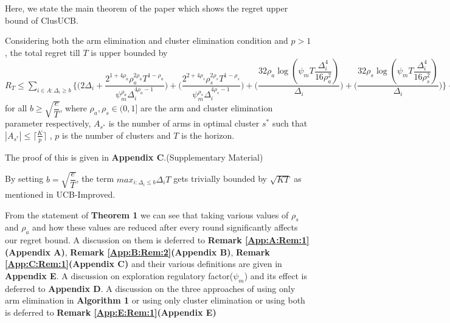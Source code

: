 	
	Here, we state the main theorem of the paper which shows the regret upper bound of ClusUCB.
	
\begin{theorem}
\label{Result:Theorem:1}
Considering both the arm elimination and cluster elimination condition and $p>1$, the total regret till $T$ is upper bounded by $R_{T}\leq \sum\limits_{i\in A:\Delta_{i}\geq b} \bigg\lbrace \bigg(2\Delta_{i}+\dfrac{2^{1+4\rho_{a}}\rho_{a}^{2\rho_{a}}T^{1-\rho_{a}}}{\psi_{m}^{\rho_{a}}\Delta_{i}^{4\rho_{a}-1}}\bigg) + \bigg(\dfrac{2^{2+4\rho_{s}}\rho_{s}^{2\rho_{s}}T^{1-\rho_{s}}}{\psi_{m}^{\rho_{s}}\Delta_{i}^{4\rho_{s}-1}}\bigg) + \bigg(\dfrac{32\rho_{a}\log{(\psi_{m}T\dfrac{\Delta_{i}^{4}}{16\rho_{a}^{2}})}}{\Delta_{i}}\bigg) + \bigg(\dfrac{32\rho_{s}\log{(\psi_{m}T\dfrac{\Delta_{i}^{4}}{16\rho_{s}^{2}})}}{\Delta_{i}}\bigg)\bigg\rbrace + \sum\limits_{i\in A_{s^{*}}:0\leq\Delta_{i}\leq b}\bigg\lbrace \bigg(\dfrac{T^{1-\rho_{a}}\rho_{a}^{2\rho_{a}}2^{2\rho_{a}+\frac{3}{2}}}{\psi_{m}^{\rho_{a}}\Delta_{i}^{4\rho_{a}-1}} \bigg)+\bigg(\dfrac{T^{1-\rho_{a}}\rho_{a}^{2\rho_{a}}2^{2\rho_{a}+\frac{3}{2}}}{\psi_{m}^{\rho_{a}}b^{4\rho_{a} -1}} \bigg)\bigg\rbrace + \sum\limits_{i\in A:0\leq\Delta_{i}\leq b}\bigg\lbrace  \bigg(\dfrac{T^{1-\rho_{s}}\rho_{s}^{2\rho_{s}}2^{2\rho_{s}+3}}{\psi_{m}^{\rho_{s}}\Delta_{i}^{4\rho_{s}-1}} \bigg)+\bigg(\dfrac{T^{1-\rho_{s}}\rho_{s}^{2\rho_{s}}2^{2\rho_{s}+3}}{\psi_{m}^{\rho_{s}}b^{4\rho_{s} -1}} \bigg) \bigg\rbrace + max_{i:\Delta_{i}\leq b}\Delta_{i}T$ for all $b\geq \sqrt{\dfrac{e}{T}}$, where $\rho_{a},\rho_{s}\in (0,1]$ are the arm and cluster elimination parameter respectively, $A_{s^{*}}$ is the number of arms in optimal cluster $s^{*}$ such that $|A_{s^{*}}|\leq \big\lceil\frac{K}{p}\big\rceil$ , $p$ is the number of clusters and $T$ is the horizon.
\end{theorem}


	The proof of this is given in \textbf{Appendix C}.(Supplementary Material)
	
\begin{remark}
\label{Result:Rem:1}
By setting $b=\sqrt{\dfrac{e}{T}}$, the term $max_{i:\Delta_{i}\leq b}\Delta_{i}T$ gets trivially bounded by $\sqrt{KT}$ as mentioned in UCB-Improved.
\end{remark}

\begin{remark}
\label{Result:Rem:2}
From the statement of \textbf{Theorem 1} we can see that taking various values of $\rho_{s}$ and $\rho_{a}$ and how these values are reduced after every round significantly affects our regret bound. A discussion on them is deferred to \textbf{Remark \ref{App:A:Rem:1}(Appendix A)}, \textbf{Remark \ref{App:B:Rem:2}(Appendix B)}, \textbf{Remark \ref{App:C:Rem:1}(Appendix C)} and their various definitions are given in \textbf{Appendix E}. A discussion on exploration regulatory factor($\psi_{m}$) and its effect is deferred to \textbf{Appendix D}. A discussion on the three approaches of using only arm elimination in \textbf{Algorithm 1} or using only cluster elimination or using both is deferred to \textbf{Remark \ref{App:E:Rem:1}(Appendix E)}
\end{remark}

